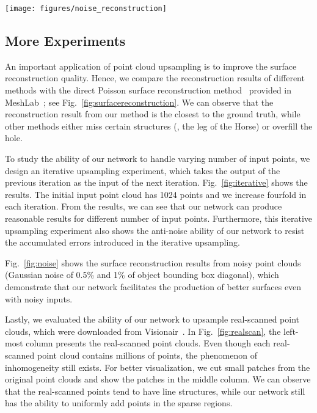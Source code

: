 \begin{figure*}[!t]
	\centering
	\texttt{[image: figures/noise\_reconstruction]}
	\caption{Surface reconstruction results from noisy input points.}
	\label{fig:noise}\vspace{-2mm}
\end{figure*}



\subsection{More Experiments}
\label{sec:moreresults}

An important application of point cloud upsampling is to improve the surface reconstruction quality.
Hence, we compare the reconstruction results of different methods with the direct Poisson surface reconstruction method~\cite{poisson2006} provided in MeshLab~\cite{LocalChapterEvents:ItalChap:ItalianChapConf2008:129-136}; see Fig.~\ref{fig:surfacereconstruction}. 
We can observe that the reconstruction result from our method is the closest to the ground truth, while other methods either miss certain structures (\eg, the leg of the Horse) or overfill the hole.

To study the ability of our network to handle varying number of input points, we design an iterative upsampling experiment, which takes the output of the previous iteration as the input of the next iteration.
Fig.~\ref{fig:iterative} shows the results.
The initial input point cloud has 1024 points and we increase fourfold in each iteration.
From the results, we can see that our network can produce reasonable results for different number of input points.
Furthermore, this iterative upsampling experiment also shows the anti-noise ability of our network to resist the accumulated errors introduced in the iterative upsampling.



Fig.~\ref{fig:noise} shows the surface reconstruction results from noisy point clouds (Gaussian noise of 0.5\% and 1\% of object bounding box diagonal), which demonstrate that our network facilitates the production of better surfaces even with noisy inputs.



Lastly, we evaluated the ability of our network to upsample real-scanned point clouds, which were downloaded from Visionair~\cite{timmurphy.org}.
In Fig.~\ref{fig:realscan}, the left-most column presents the real-scanned point clouds. 
Even though each real-scanned point cloud contains millions of points, the phenomenon of inhomogeneity still exists.
For better visualization, we cut small patches from the original point clouds and show the patches in the middle column.
We can observe that the real-scanned points tend to have line structures, while our network still has the ability to uniformly add points in the sparse regions.

